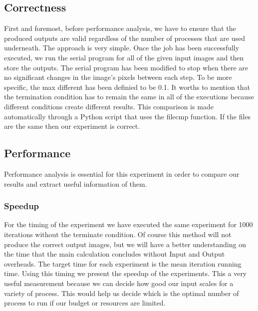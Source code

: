 \documentclass[12pt,a4paper]{article}
\begin{document}
    \subsection{Correctness}
        First and foremost, before performance analysis, we have to ensure that the produced outputs are valid regardless of the number of processes that are used underneath. The approach is very simple. Once the job has been successfully executed, we run the serial program for all of the given input images and then store the outputs. The serial program has been modified to stop when there are no significant changes in the image's pixels between each step. To be more specific, the max different has been definied to be 0.1. It worths to mention that the termination condition has to remain the same in all of the executions because different conditions create different results. This comparison is made automatically through a Python script that uses the filecmp function. If the files are the same then our experiment is correct.


    \subsection{Performance}
        Performance analysis is essential for this experiment in order to compare our results and extract useful information of them.

        \subsubsection{Speedup}
            For the timing of the experiment we have executed the same experiment for 1000 iterations without the terminate condition. Of course this method will not produce the correct output images, but we will have a better understanding on the time that the main calculation concludes without Input and Output overheads. The target time for each experiment is the mean iteration running time. Using this timing we present the speedup of the experiments. This a very useful measurement because we can decide how good our input scales for a variety of process. This would help us decide which is the optimal number of process to run if our budget or resources are limited.
\end{document}
